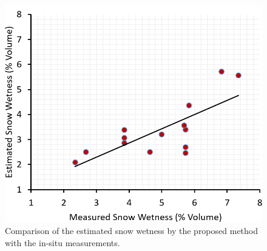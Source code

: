 \begin{figure}[!htbp]
	\centering
	\includegraphics[width=\columnwidth]{Figures_SW2/Validation_plot_SW_dual}
	\caption [Validation of snow wetness method for dual pol data]{Comparison of the estimated snow wetness by the proposed method with the in-situ measurements.}
	\label{fig:validation_plot_dualpol}
\end{figure}

